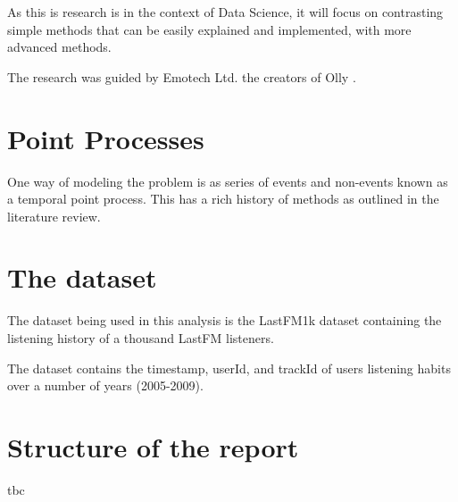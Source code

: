 As this is research is in the context of Data Science, it will focus on contrasting simple methods that can be easily explained and implemented, with more advanced methods.

The research was guided by Emotech Ltd. the creators of Olly \parencite{Olly}.

\section{Point Processes}

One way of modeling the problem is as series of events and non-events known as a temporal point process. This has a rich history of methods as outlined in the literature review. 


\section{The dataset}
The dataset being used in this analysis is the LastFM1k dataset containing the listening history of a thousand LastFM listeners.

The dataset contains the timestamp, userId, and trackId of users listening habits over a number of years (2005-2009).

\section{Structure of the report}
tbc
